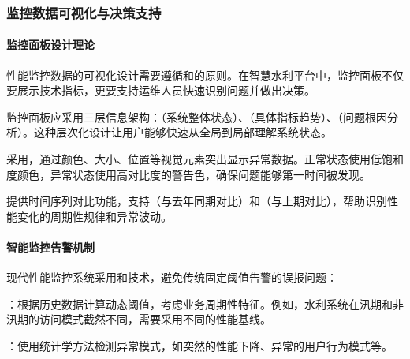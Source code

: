\hypertarget{ux76d1ux63a7ux6570ux636eux53efux89c6ux5316ux4e0eux51b3ux7b56ux652fux6301}{%
\subsubsection{监控数据可视化与决策支持}\label{ux76d1ux63a7ux6570ux636eux53efux89c6ux5316ux4e0eux51b3ux7b56ux652fux6301}}

\hypertarget{ux76d1ux63a7ux9762ux677fux8bbeux8ba1ux7406ux8bba}{%
\paragraph{监控面板设计理论}\label{ux76d1ux63a7ux9762ux677fux8bbeux8ba1ux7406ux8bba}}

性能监控数据的可视化设计需要遵循和的原则。在智慧水利平台中，监控面板不仅要展示技术指标，更要支持运维人员快速识别问题并做出决策。



监控面板应采用三层信息架构：（系统整体状态）、（具体指标趋势）、（问题根因分析）。这种层次化设计让用户能够快速从全局到局部理解系统状态。


采用，通过颜色、大小、位置等视觉元素突出显示异常数据。正常状态使用低饱和度颜色，异常状态使用高对比度的警告色，确保问题能够第一时间被发现。


提供时间序列对比功能，支持（与去年同期对比）和（与上期对比），帮助识别性能变化的周期性规律和异常波动。

\hypertarget{ux667aux80fdux76d1ux63a7ux544aux8b66ux673aux5236}{%
\paragraph{智能监控告警机制}\label{ux667aux80fdux76d1ux63a7ux544aux8b66ux673aux5236}}

现代性能监控系统采用和技术，避免传统固定阈值告警的误报问题：

：根据历史数据计算动态阈值，考虑业务周期性特征。例如，水利系统在汛期和非汛期的访问模式截然不同，需要采用不同的性能基线。

：使用统计学方法检测异常模式，如突然的性能下降、异常的用户行为模式等。

